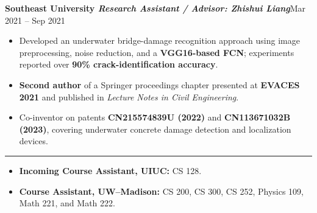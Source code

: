 \documentclass[10pt]{article}
\newcommand{\ressection}[1]{\vspace{4pt}{\normalsize\bfseries #1}\par\vspace{4pt}\hrule\vspace{5pt}}
\newcommand{\entry}[3]{\textbf{#1}\hfill {#2}\par\if\relax\detokenize{#3}\relax\vspace{-2pt}\else{\fontsize{9}{11.5}\selectfont\textit{#3}\par}\fi}
\newenvironment{tightitems}{\setlength{\leftmargini}{1.4em}\begin{itemize}\setlength{\itemsep}{0pt}\setlength{\topsep}{1pt}\setlength{\partopsep}{0pt}\setlength{\parsep}{0pt}\setlength{\parskip}{0pt}}{\end{itemize}\vspace{-1pt}}
\begin{document}
\entry{Southeast University \normalfont\textit{Research Assistant / Advisor: Zhishui Liang}}{Mar 2021 -- Sep 2021}{}
\begin{tightitems}
  \item Developed an underwater bridge-damage recognition approach using image preprocessing, noise reduction, and a \textbf{VGG16-based FCN}; experiments reported over \textbf{90\% crack-identification accuracy}.
  \item \textbf{Second author} of a Springer proceedings chapter presented at \textbf{EVACES 2021} and published in \emph{Lecture Notes in Civil Engineering}.
  \item Co-inventor on patents \textbf{CN215574839U (2022)} and \textbf{CN113671032B (2023)}, covering underwater concrete damage detection and localization devices.
\end{tightitems}

\ressection{Teaching}
\begin{tightitems}
  \item \textbf{Incoming Course Assistant, UIUC:} CS 128.
  \item \textbf{Course Assistant, UW--Madison:} CS 200, CS 300, CS 252, Physics 109, Math 221, and Math 222.
\end{tightitems}
\end{document}
